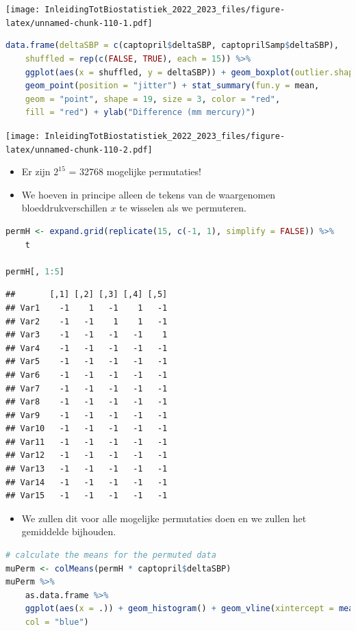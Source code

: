 \documentclass[
  12pt,dutch,coursenotes]{book}
\providecommand{\tightlist}{%
  \setlength{\itemsep}{0pt}\setlength{\parskip}{0pt}}
\begin{document}
\texttt{[image: InleidingTotBiostatistiek\_2022\_2023\_files/figure-latex/unnamed-chunk-110-1.pdf]}

\begin{lstlisting}[language=R]
data.frame(deltaSBP = c(captopril$deltaSBP, captoprilSamp$deltaSBP),
    shuffled = rep(c(FALSE, TRUE), each = 15)) %>%
    ggplot(aes(x = shuffled, y = deltaSBP)) + geom_boxplot(outlier.shape = NA) +
    geom_point(position = "jitter") + stat_summary(fun.y = mean,
    geom = "point", shape = 19, size = 3, color = "red",
    fill = "red") + ylab("Difference (mm mercury)")
\end{lstlisting}

\texttt{[image: InleidingTotBiostatistiek\_2022\_2023\_files/figure-latex/unnamed-chunk-110-2.pdf]}

\begin{itemize}
\tightlist
\item
  Er zijn \(2^{15}\) = 32768 mogelijke permutaties!
\item
  We hoeven in principe alleen de tekens van de waargenomen bloeddrukverschillen \(x\) te wisselen als we permuteren.
\end{itemize}

\begin{lstlisting}[language=R]
permH <- expand.grid(replicate(15, c(-1, 1), simplify = FALSE)) %>%
    t

permH[, 1:5]
\end{lstlisting}

\begin{lstlisting}
##       [,1] [,2] [,3] [,4] [,5]
## Var1    -1    1   -1    1   -1
## Var2    -1   -1    1    1   -1
## Var3    -1   -1   -1   -1    1
## Var4    -1   -1   -1   -1   -1
## Var5    -1   -1   -1   -1   -1
## Var6    -1   -1   -1   -1   -1
## Var7    -1   -1   -1   -1   -1
## Var8    -1   -1   -1   -1   -1
## Var9    -1   -1   -1   -1   -1
## Var10   -1   -1   -1   -1   -1
## Var11   -1   -1   -1   -1   -1
## Var12   -1   -1   -1   -1   -1
## Var13   -1   -1   -1   -1   -1
## Var14   -1   -1   -1   -1   -1
## Var15   -1   -1   -1   -1   -1
\end{lstlisting}

\begin{itemize}
\tightlist
\item
  We zullen dit voor alle mogelijke permutaties doen en we zullen het gemiddelde bijhouden.
\end{itemize}

\begin{lstlisting}[language=R]
# calculate the means for the permuted data
muPerm <- colMeans(permH * captopril$deltaSBP)
muPerm %>%
    as.data.frame %>%
    ggplot(aes(x = .)) + geom_histogram() + geom_vline(xintercept = mean(captopril$deltaSBP),
    col = "blue")
\end{lstlisting}
\end{document}
